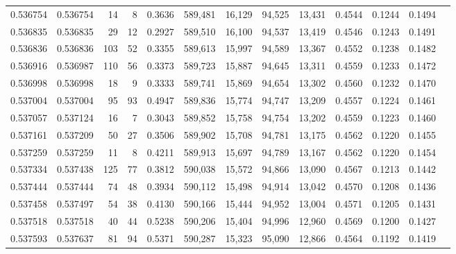 \begin{tabular}{rrrrrrrrrrrrr}
0.536754 & 0.536754 &    14 &     8 &                                     0.3636 & 589,481 &  16,129 &  94,525 &  13,431 & 0.4544 & 0.1244 & 0.1494 \\
0.536835 & 0.536835 &    29 &    12 &                                     0.2927 & 589,510 &  16,100 &  94,537 &  13,419 & 0.4546 & 0.1243 & 0.1491 \\
0.536836 & 0.536836 &   103 &    52 &                                     0.3355 & 589,613 &  15,997 &  94,589 &  13,367 & 0.4552 & 0.1238 & 0.1482 \\
0.536916 & 0.536987 &   110 &    56 &                                     0.3373 & 589,723 &  15,887 &  94,645 &  13,311 & 0.4559 & 0.1233 & 0.1472 \\
0.536998 & 0.536998 &    18 &     9 &                                     0.3333 & 589,741 &  15,869 &  94,654 &  13,302 & 0.4560 & 0.1232 & 0.1470 \\
0.537004 & 0.537004 &    95 &    93 &                                     0.4947 & 589,836 &  15,774 &  94,747 &  13,209 & 0.4557 & 0.1224 & 0.1461 \\
0.537057 & 0.537124 &    16 &     7 &                                     0.3043 & 589,852 &  15,758 &  94,754 &  13,202 & 0.4559 & 0.1223 & 0.1460 \\
0.537161 & 0.537209 &    50 &    27 &                                     0.3506 & 589,902 &  15,708 &  94,781 &  13,175 & 0.4562 & 0.1220 & 0.1455 \\
0.537259 & 0.537259 &    11 &     8 &                                     0.4211 & 589,913 &  15,697 &  94,789 &  13,167 & 0.4562 & 0.1220 & 0.1454 \\
0.537334 & 0.537438 &   125 &    77 &                                     0.3812 & 590,038 &  15,572 &  94,866 &  13,090 & 0.4567 & 0.1213 & 0.1442 \\
0.537444 & 0.537444 &    74 &    48 &                                     0.3934 & 590,112 &  15,498 &  94,914 &  13,042 & 0.4570 & 0.1208 & 0.1436 \\
0.537458 & 0.537497 &    54 &    38 &                                     0.4130 & 590,166 &  15,444 &  94,952 &  13,004 & 0.4571 & 0.1205 & 0.1431 \\
0.537518 & 0.537518 &    40 &    44 &                                     0.5238 & 590,206 &  15,404 &  94,996 &  12,960 & 0.4569 & 0.1200 & 0.1427 \\
0.537593 & 0.537637 &    81 &    94 &                                     0.5371 & 590,287 &  15,323 &  95,090 &  12,866 & 0.4564 & 0.1192 & 0.1419 \\

\end{tabular}
